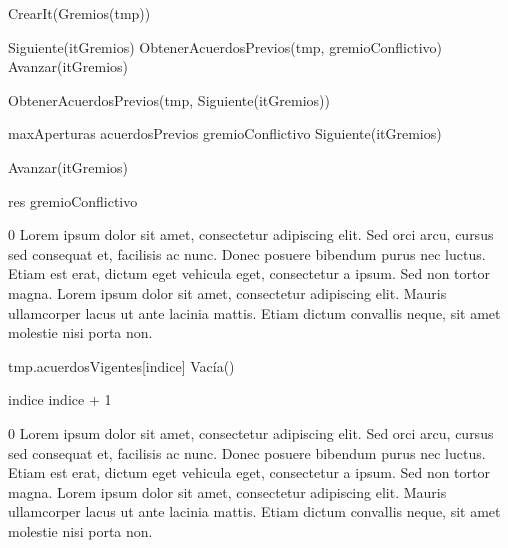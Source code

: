 {
	\state {} \asig CrearIt(Gremios(tmp))						
	\state

	\state {} \asig Siguiente(itGremios)				
	\state {} \asig ObtenerAcuerdosPrevios(tmp, gremioConflictivo)		
	\state Avanzar(itGremios)																
	\state

																	
		\state

		\state {} \asig ObtenerAcuerdosPrevios(tmp, Siguiente(itGremios))		

									

			\state maxAperturas \asig acuerdosPrevios						
			\state gremioConflictivo \asig Siguiente(itGremios)			
		\endif

		\state
		\state Avanzar(itGremios)										
	\endwhile
	\state

	\state res \asig *gremioConflictivo									
}
{0}
{Lorem ipsum dolor sit amet, consectetur adipiscing elit. Sed orci arcu, cursus sed consequat et, facilisis ac nunc. Donec posuere bibendum purus nec luctus. Etiam est erat, dictum eget vehicula eget, consectetur a ipsum. Sed non tortor magna. Lorem ipsum dolor sit amet, consectetur adipiscing elit. Mauris ullamcorper lacus ut ante lacinia mattis. Etiam dictum convallis neque, sit amet molestie nisi porta non.}

{
	\state {} 									
				
		\state

		\state tmp.acuerdosVigentes[indice] \asig Vacía()				

		\state
		\state indice \asig indice + 1									
	\endwhile

}
{0}
{Lorem ipsum dolor sit amet, consectetur adipiscing elit. Sed orci arcu, cursus sed consequat et, facilisis ac nunc. Donec posuere bibendum purus nec luctus. Etiam est erat, dictum eget vehicula eget, consectetur a ipsum. Sed non tortor magna. Lorem ipsum dolor sit amet, consectetur adipiscing elit. Mauris ullamcorper lacus ut ante lacinia mattis. Etiam dictum convallis neque, sit amet molestie nisi porta non.}

